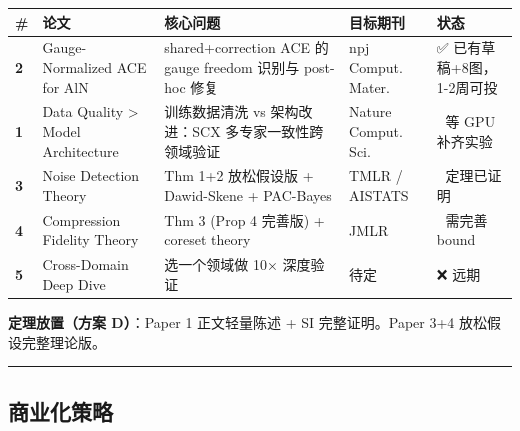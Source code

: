 \documentclass[
  12pt,
]{ctexart}
\begin{document}
\begin{longtable}[]{@{}
  >{\raggedright\arraybackslash}p{}
  >{\raggedright\arraybackslash}p{}
  >{\raggedright\arraybackslash}p{}
  >{\raggedright\arraybackslash}p{}
  >{\raggedright\arraybackslash}p{}@{}}
\toprule\noalign{}
\begin{minipage}[b]{\linewidth}\raggedright
\#
\end{minipage} & \begin{minipage}[b]{\linewidth}\raggedright
论文
\end{minipage} & \begin{minipage}[b]{\linewidth}\raggedright
核心问题
\end{minipage} & \begin{minipage}[b]{\linewidth}\raggedright
目标期刊
\end{minipage} & \begin{minipage}[b]{\linewidth}\raggedright
状态
\end{minipage} \\
\midrule\noalign{}
\endhead
\bottomrule\noalign{}
\endlastfoot
\textbf{2} & Gauge-Normalized ACE for AlN & shared+correction ACE 的
gauge freedom 识别与 post-hoc 修复 & npj Comput. Mater. & ✅
已有草稿+8图，1-2周可投 \\
\textbf{1} & Data Quality \textgreater{} Model Architecture &
训练数据清洗 vs 架构改进：SCX 多专家一致性跨领域验证 & Nature Comput.
Sci. & 🔴 等 GPU 补齐实验 \\
\textbf{3} & Noise Detection Theory & Thm 1+2 放松假设版 + Dawid-Skene +
PAC-Bayes & TMLR / AISTATS & 📐 定理已证明 \\
\textbf{4} & Compression Fidelity Theory & Thm 3 (Prop 4 完善版) +
coreset theory & JMLR & 📐 需完善 bound \\
\textbf{5} & Cross-Domain Deep Dive & 选一个领域做 10× 深度验证 & 待定 &
❌ 远期 \\
\end{longtable}

\textbf{定理放置（方案 D）}：Paper 1 正文轻量陈述 + SI 完整证明。Paper
3+4 放松假设完整理论版。

\begin{center}\rule{0.5\linewidth}{0.5pt}\end{center}

\subsection{商业化策略}\label{ux5546ux4e1aux5316ux7b56ux7565}
\end{document}
